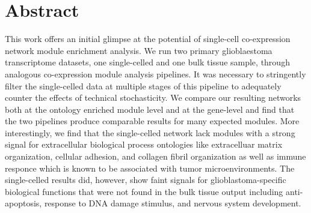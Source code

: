 \documentclass[10pt,letterpaper]{article}
\begin{document}
\section*{Abstract}
This work offers an initial glimpse at the potential of single-cell co-expression network module enrichment analysis. We run two primary glioblaestoma transcriptome datasets, one single-celled and one bulk tissue sample, through analogous co-expression module analysis pipelines. It was necessary to stringently filter the single-celled data at multiple stages of this pipeline to adequately counter the effects of technical stochasticity. We compare our resulting networks both at the ontology enriched module level and at the gene-level and find that the two pipelines produce comparable results for many expected modules. More interestingly, we find that the single-celled network lack modules with a strong signal for extracellular biological process ontologies like extracelluar matrix organization, cellular adhesion, and collagen fibril organization as well as immune responce which is known to be associated with tumor microenvironments. The single-celled results did, however, show faint signals for glioblastoma-specific biological functions that were not found in the bulk tissue output including anti-apoptosis, response to DNA damage stimulus, and nervous system development.


\linenumbers
\end{document}
